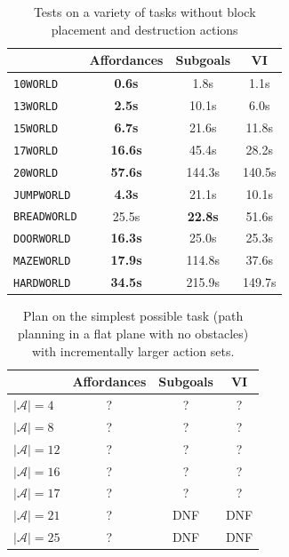 \documentclass[]{article}
\begin{document}
\begin{table}
\begin{tabular}{ l || c | c | c }
  & Affordances & Subgoals & VI \\
  \hline
  \texttt{10WORLD} 		&	{\bf 0.6s} 		&	 1.8s 		& 1.1s  \\
  \texttt{13WORLD} 		&	{\bf 2.5s} 	 	& 	10.1s 		& 6.0s  \\
  \texttt{15WORLD} 		&	{\bf 6.7s} 	 	& 	21.6s 		& 11.8s  \\
  \texttt{17WORLD} 		& 	{\bf 16.6s} 	& 	45.4s 		& 28.2s  \\
  \texttt{20WORLD} 		& 	{\bf 57.6s} 	& 	144.3s 		& 140.5s  \\
  \texttt{JUMPWORLD}  	& 	{\bf 4.3s} 		& 	21.1s 		& 10.1s \\
  \texttt{BREADWORLD}  	& 	25.5s		& 	{\bf 22.8s} 	& 51.6s \\
  \texttt{DOORWORLD}  	& 	{\bf 16.3s} 	& 	25.0s 		& 25.3s \\
  \texttt{MAZEWORLD}  	& 	{\bf 17.9s} 	& 	114.8s		& 37.6s \\
  \texttt{HARDWORLD} 	& 	{\bf 34.5s}  	& 	215.9s 		& 149.7s
\end{tabular} 
\label{results_1}
\caption{Tests on a variety of tasks without block placement and destruction actions}
\end{table}

\vspace{4 mm}

\begin{table}
\begin{tabular}{ l || c | c | c }
  & Affordances & Subgoals & VI \\
  \hline
  $|\mathcal{A}| = 4$ 		& 	? 	& 	? 		& ?  \\
  $|\mathcal{A}| = 8$ 		& 	? 	& 	? 		& ?  \\
  $|\mathcal{A}| = 12$ 	& 	? 	& 	? 		& ?  \\
  $|\mathcal{A}| = 16$ 	& 	? 	& 	? 		& ?  \\
  $|\mathcal{A}| = 17$ 	& 	? 	& 	? 		& ?  \\
  $|\mathcal{A}| = 21$ 	& 	? 	& 	DNF 		& DNF  \\
  $|\mathcal{A}| = 25$ 	& 	? 	& 	DNF 		& DNF  \\
\end{tabular}
\label{results_2}
\caption{Plan on the simplest possible task (path planning in a flat plane with no obstacles) with incrementally larger action sets.}
\end{table}
\end{document}
